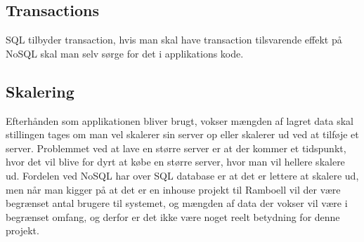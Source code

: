 \subsection{Transactions}
SQL tilbyder transaction, hvis man skal have transaction tilsvarende effekt på NoSQL skal man selv sørge for det i applikations kode.
 
\subsection{Skalering}
Efterhånden som applikationen bliver brugt, vokser mængden af lagret data skal stillingen tages om man vel skalerer sin server op eller skalerer ud ved at tilføje et server. Problemmet ved at lave en større server er at der kommer et tidspunkt, hvor det vil blive for dyrt at købe en større server, hvor man vil hellere skalere ud. Fordelen ved NoSQL har over SQL database er at det er lettere at skalere ud, men
når man kigger på at det er en inhouse projekt til Ramboell vil der være begrænset antal brugere til systemet, og mængden af data der vokser vil være i begrænset omfang, og derfor er det ikke være noget reelt betydning for denne projekt. 

\clearpage
